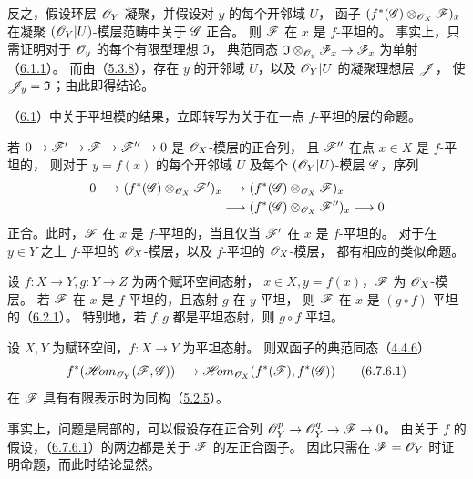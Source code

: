 反之，假设环层 $\mathscr O_Y$ 凝聚，并假设对 $y$ 的每个开邻域 $U$，
函子 $(f^*(\mathscr G)\otimes_{\mathscr O_X}\mathscr F)_x$ 在凝聚 $(\mathscr O_Y|U)$-模层范畴中关于 $\mathscr G$ 正合。
则 $\mathscr F$ 在 $x$ 是 $f$-平坦的。
事实上，只需证明对于 $\mathscr O_y$ 的每个有限型理想 $\mathfrak I$，
典范同态 $\mathfrak I\otimes_{\mathscr O_y}\mathscr F_x\to\mathscr F_x$ 为单射（\hyperlink{para:0:6.1.1}{6.1.1}）。
而由（\hyperlink{para:0:5.3.8}{5.3.8}），存在 $y$ 的开邻域 $U$，以及 $\mathscr O_Y|U$ 的凝聚理想层 $\mathscr J$，
使 $\mathscr J_y=\mathfrak I$；由此即得结论。

（\hyperlink{heading:0:6.1}{6.1}）中关于平坦模的结果，立即转写为关于在一点 $f$-平坦的层的命题。

若 $0\to\mathscr F'\to\mathscr F\to\mathscr F''\to0$ 是 $\mathscr O_X$-模层的正合列，
且 $\mathscr F''$ 在点 $x\in X$ 是 $f$-平坦的，
则对于 $y=f(x)$ 的每个开邻域 $U$ 及每个 $(\mathscr O_Y|U)$-模层 $\mathscr G$，序列
\[
 \begin{aligned}
 0\longrightarrow(f^*(\mathscr G)\otimes_{\mathscr O_X}\mathscr F')_x
 &\longrightarrow(f^*(\mathscr G)\otimes_{\mathscr O_X}\mathscr F)_x\\
 &\longrightarrow(f^*(\mathscr G)\otimes_{\mathscr O_X}\mathscr F'')_x
 \longrightarrow0
 \end{aligned}
\]
正合。此时，$\mathscr F$ 在 $x$ 是 $f$-平坦的，当且仅当 $\mathscr F'$ 在 $x$ 是 $f$-平坦的。
对于在 $y\in Y$ 之上 $f$-平坦的 $\mathscr O_X$-模层，以及 $f$-平坦的 $\mathscr O_X$-模层，
都有相应的类似命题。

设 $f\colon X\to Y,g\colon Y\to Z$ 为两个赋环空间态射，
$x\in X,y=f(x)$，$\mathscr F$ 为 $\mathscr O_X$-模层。
若 $\mathscr F$ 在 $x$ 是 $f$-平坦的，且态射 $g$ 在 $y$ 平坦，
则 $\mathscr F$ 在 $x$ 是 $(g\circ f)$-平坦的（\hyperlink{para:0:6.2.1}{6.2.1}）。
特别地，若 $f,g$ 都是平坦态射，则 $g\circ f$ 平坦。

设 $X,Y$ 为赋环空间，$f\colon X\to Y$ 为平坦态射。
则双函子的典范同态（\hyperlink{para:0:4.4.6}{4.4.6}）
\begin{equation}
 f^*(\mathscr{H}\!om_{\mathscr O_Y}(\mathscr F,\mathscr G))
 \longrightarrow\mathscr{H}\!om_{\mathscr O_X}(f^*(\mathscr F),f^*(\mathscr G))
 \tag{6.7.6.1}\label{eq:0:6.7.6.1}
\end{equation}
在 $\mathscr F$ 具有有限表示时为同构（\hyperlink{para:0:5.2.5}{5.2.5}）。

事实上，问题是局部的，可以假设存在正合列
$\mathscr O_Y^p\to\mathscr O_Y^q\to\mathscr F\to0$。
由关于 $f$ 的假设，（\hyperref[eq:0:6.7.6.1]{6.7.6.1}）的两边都是关于 $\mathscr F$ 的左正合函子。
因此只需在 $\mathscr F=\mathscr O_Y$ 时证明命题，而此时结论显然。

